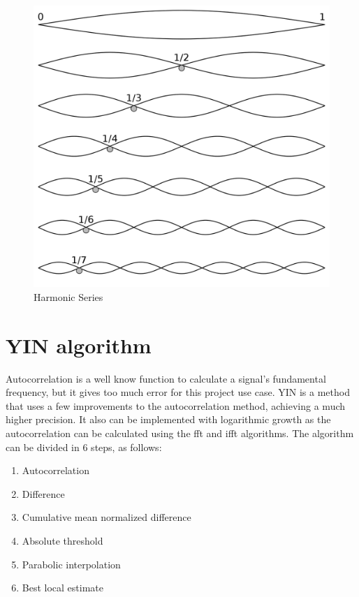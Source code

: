 \begin{figure}[htb]
	\caption{Harmonic Series}
  \label{harmonic-series}
	\begin{center}
    \includegraphics[scale=0.15]{images/harmonic-series.png}
	\end{center}
\end{figure}

\section{YIN algorithm}
Autocorrelation is a well know function to calculate a signal's fundamental
frequency, but it gives too much error for this project use case. YIN \cite{YINArticle}
is a method that uses a few improvements to the autocorrelation method, achieving
a much higher precision. It also can be implemented with logarithmic growth as the
autocorrelation can be calculated using the fft and ifft algorithms. The algorithm
can be divided in 6 steps, as follows:

\begin{enumerate}
  \item Autocorrelation
  \item Difference
  \item Cumulative mean normalized difference
  \item Absolute threshold
  \item Parabolic interpolation
  \item Best local estimate
\end{enumerate}

